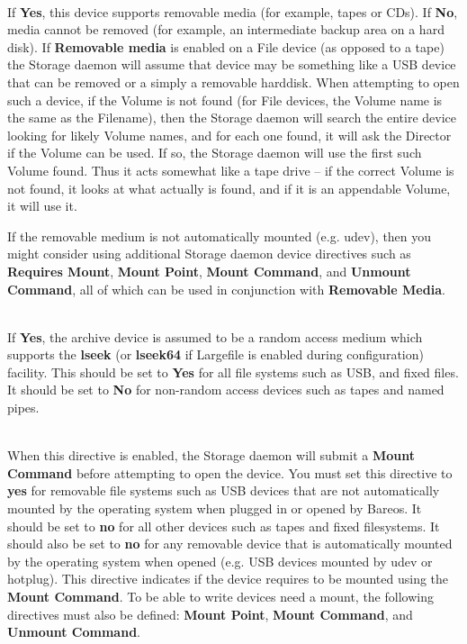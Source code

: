 \begin{description}
\label{removablemedia}
\item [Removable media = {\textless}yes{\textbar}no{\textgreater}] \hfill \\
If {\bf Yes}, this device supports removable media (for example, tapes
or CDs).  If {\bf No}, media cannot be removed (for example, an
intermediate backup area on a hard disk). If {\bf Removable media} is
enabled on a File device (as opposed to a tape) the Storage daemon will
assume that device may be something like a USB device that can be
removed or a simply a removable harddisk. When attempting to open
such a device, if the Volume is not found (for File devices, the Volume
name is the same as the Filename), then the Storage daemon will search
the entire device looking for likely Volume names, and for each one
found, it will ask the Director if the Volume can be used.  If so,
the Storage daemon will use the first such Volume found.  Thus it
acts somewhat like a tape drive -- if the correct Volume is not found,
it looks at what actually is found, and if it is an appendable Volume,
it will use it.

If the removable medium is not automatically mounted (e.g. udev), then
you might consider using additional Storage daemon device directives
such as {\bf Requires Mount}, {\bf Mount Point}, {\bf Mount Command},
and {\bf Unmount Command}, all of which can be used in conjunction with
{\bf Removable Media}.

\item [Random access = {\textless}yes{\textbar}no{\textgreater}] \hfill \\
If {\bf Yes}, the archive device is assumed to be a random access medium
which supports the {\bf lseek} (or {\bf lseek64} if Largefile is enabled
during configuration) facility. This should be set to {\bf Yes} for all
file systems such as USB, and fixed files.  It should be set to
{\bf No} for non-random access devices such as tapes and named pipes.

\item [Requires Mount = {\textless}yes{\textbar}no{\textgreater}] \hfill \\
When this directive is enabled, the Storage daemon will submit
a {\bf Mount Command} before attempting to open the device.
You must set this directive to {\bf yes} for removable
file systems such as USB devices that are not automatically mounted
by the operating system when plugged in or opened by Bareos.
It should be set to {\bf no} for
all other devices such as tapes and fixed filesystems. It should also
be set to {\bf no} for any removable device that is automatically
mounted by the operating system when opened (e.g. USB devices mounted
by udev or hotplug). This directive
indicates if the device requires to be mounted using the {\bf Mount
Command}.  To be able to write devices need a mount, the following
directives must also be defined: {\bf Mount Point}, {\bf Mount Command},
and {\bf Unmount Command}.


\end{description}
